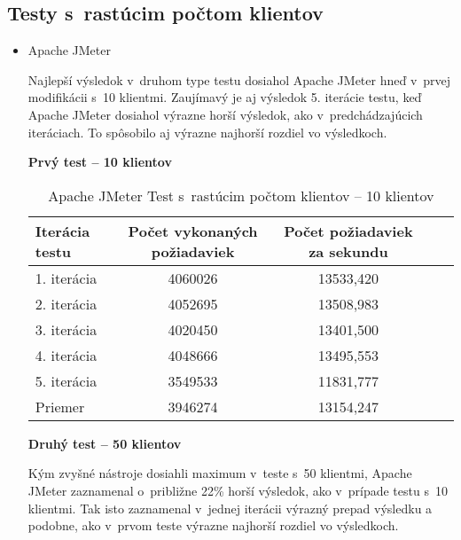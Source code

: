 \documentclass[12pt,oneside,final]{fithesis-utf8}
\begin{document}
\subsection{Testy s~rastúcim počtom klientov}

\begin{itemize}

\item Apache JMeter

Najlepší výsledok v~druhom type testu dosiahol Apache JMeter hneď v~prvej modifikácii s~10 klientmi. Zaujímavý je aj výsledok 5. iterácie testu, keď Apache JMeter dosiahol výrazne horší výsledok, ako v~predchádzajúcich iteráciach. To spôsobilo aj výrazne najhorší rozdiel vo výsledkoch.

\textbf{Prvý test -- 10 klientov}

\begin{table}[H]
\begin{center}
\begin{tabular}{ | l | c | c | c | c |}
		\hline
		 \textbf{Iterácia testu} & \textbf{Počet vykonaných požiadaviek} & \textbf{Počet požiadaviek za sekundu} \\ \hline
		 1. iterácia & 4060026 & 13533,420 \\ \hline
		 2. iterácia & 4052695 & 13508,983 \\ \hline
		 3. iterácia & 4020450 & 13401,500 \\ \hline
		 4. iterácia & 4048666 & 13495,553 \\ \hline
		 5. iterácia & 3549533 & 11831,777 \\ \hline
		 Priemer & 3946274 & 13154,247 \\ \hline
		 
\end{tabular}
\end{center}
\caption{Apache JMeter Test s~rastúcim počtom klientov -- 10 klientov}
\end{table}


\textbf{Druhý test -- 50 klientov}

Kým zvyšné nástroje dosiahli maximum v~teste s~50 klientmi, Apache JMeter zaznamenal o~približne 22\% horší výsledok, ako v~prípade testu s~10 klientmi. Tak isto zaznamenal v~jednej iterácii výrazný prepad výsledku a podobne, ako v~prvom teste výrazne najhorší rozdiel vo výsledkoch.


\end{itemize}
\end{document}
